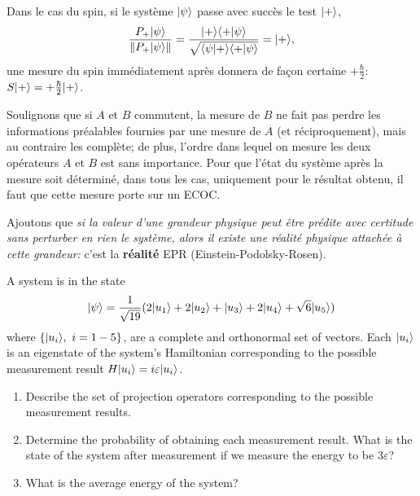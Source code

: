 Dans le cas du spin, si le système $\vert\psi\rangle$ passe avec succès le test
$\vert+\rangle$,
\begin{equation}
\frac{P_{+}\vert\psi\rangle}{\|P_{+}\vert\psi\rangle\|}=\frac{\vert+\rangle\langle+\vert\psi\rangle}
{\sqrt{\langle\psi\vert+\rangle\langle +\vert\psi\rangle}}=\vert+\rangle,
\end{equation}
une mesure du spin immédiatement après donnera de façon certaine $+\frac
{\hbar}{2}$: $S\vert+\rangle=+\frac{\hbar}{2}\vert+\rangle$.

Soulignons que si $A$ et $B$ commutent, la mesure de $B$ ne fait pas perdre
les informations préalables fournies par une mesure de $A$ (et
réciproquement), mais au contraire les complète; de plus, l'ordre dans lequel
on mesure les deux opérateurs $A$ et $B$ est sans importance. Pour que l'état
du système après la mesure soit déterminé, dans tous les cas, uniquement pour
le résultat obtenu, il faut que cette mesure porte sur un ECOC.

Ajoutons que \emph{si la valeur d'une grandeur physique peut être prédite avec
certitude sans perturber en rien le système, alors il existe une réalité
physique attachée à cette grandeur: }c'est la\textbf{ réalité }EPR
(Einstein-Podolsky-Rosen).


\begin{exercise}
 A system is in the state
\begin{equation}
 \vert\psi\rangle=\frac{1}{\sqrt{19}}(2\vert u_1\rangle+2\vert u_2\rangle+\vert u_3\rangle+2\vert u_4\rangle+
\sqrt{6}\vert u_5\rangle)
\end{equation}
where $\{\vert u_i\rangle,\ i=1-5\}$, are a complete and orthonormal set of vectors.
Each $\vert u_i\rangle$ is an eigenstate of the system’s Hamiltonian corresponding to
the possible measurement result $H\vert u_i\rangle=i\varepsilon\vert u_i\rangle$.
\begin{enumerate}
 \item Describe the set of projection operators corresponding to the
possible measurement results.
\item Determine the probability of obtaining each measurement result. What
is the state of the system after measurement if we measure the energy to be
$3\varepsilon$?
\item What is the average energy of the system?
\end{enumerate}
\end{exercise}


